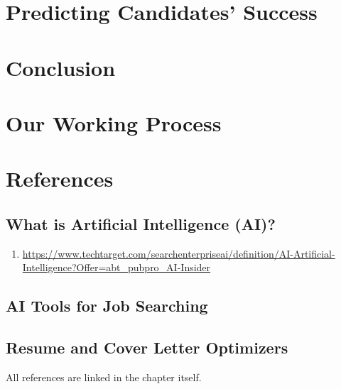 \documentclass[
]{book}
\providecommand{\tightlist}{%
  \setlength{\itemsep}{0pt}\setlength{\parskip}{0pt}}
\begin{document}
\hypertarget{predicting-candidates-success}{%
\chapter{Predicting Candidates' Success}\label{predicting-candidates-success}}

\hypertarget{conclusion}{%
\chapter{Conclusion}\label{conclusion}}

\hypertarget{our-working-process}{%
\chapter{Our Working Process}\label{our-working-process}}

\hypertarget{references}{%
\chapter{References}\label{references}}

\hypertarget{what-is-artificial-intelligence-ai-1}{%
\section{What is Artificial Intelligence (AI)?}\label{what-is-artificial-intelligence-ai-1}}

\begin{enumerate}
\def\labelenumi{(\arabic{enumi})}
\tightlist
\item
  \url{https://www.techtarget.com/searchenterpriseai/definition/AI-Artificial-Intelligence?Offer=abt_pubpro_AI-Insider}
\end{enumerate}

\hypertarget{ai-tools-for-job-searching-1}{%
\section{AI Tools for Job Searching}\label{ai-tools-for-job-searching-1}}

\hypertarget{resume-and-cover-letter-optimizers-1}{%
\section{Resume and Cover Letter Optimizers}\label{resume-and-cover-letter-optimizers-1}}

All references are linked in the chapter itself.
\end{document}
